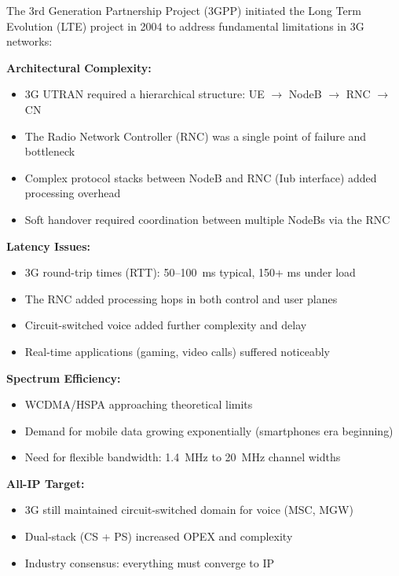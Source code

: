 

\CNchained{}

The 3rd Generation Partnership Project (3GPP) initiated the Long Term Evolution (LTE) project in 2004 to address fundamental limitations in 3G networks:

\textbf{Architectural Complexity:}

\begin{itemize}
\tightlist
\item
  3G UTRAN required a hierarchical structure: UE \ensuremath{\to} NodeB \ensuremath{\to} RNC \ensuremath{\to} CN
\item
  The Radio Network Controller (RNC) was a single point of failure and bottleneck
\item
  Complex protocol stacks between NodeB and RNC (Iub interface) added processing overhead
\item
  Soft handover required coordination between multiple NodeBs via the RNC
\end{itemize}

\textbf{Latency Issues:}

\begin{itemize}
\tightlist
\item
  3G round-trip times (RTT): 50–100~ms typical, 150+ ms under load
\item
  The RNC added processing hops in both control and user planes
\item
  Circuit-switched voice added further complexity and delay
\item
  Real-time applications (gaming, video calls) suffered noticeably
\end{itemize}

\textbf{Spectrum Efficiency:}

\begin{itemize}
\tightlist
\item
  WCDMA/\allowbreak{}HSPA approaching theoretical limits
\item
  Demand for mobile data growing exponentially (smartphones era beginning)
\item
  Need for flexible bandwidth: 1.4~MHz to 20~MHz channel widths
\end{itemize}

\textbf{All-IP Target:}

\begin{itemize}
\tightlist
\item
  3G still maintained circuit-switched domain for voice (MSC, MGW)
\item
  Dual-stack (CS + PS) increased OPEX and complexity
\item
  Industry consensus: everything must converge to IP
\end{itemize}

